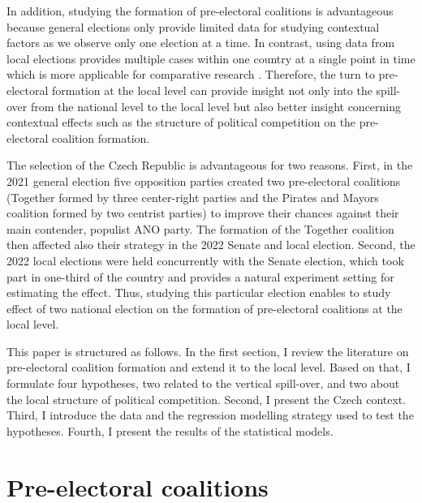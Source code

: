 \documentclass[fignum,12pt,titlepage]{article}
\begin{document}
In addition, studying the formation of pre-electoral coalitions is advantageous because general elections only provide limited data for studying contextual factors as we observe only one election at a time. In contrast, using data from local elections provides multiple cases within one country at a single point in time which is more applicable for comparative research \parencite[77]{back2008}. Therefore, the turn to pre-electoral formation at the local level can provide insight not only into the spill-over from the national level to the local level but also better insight concerning contextual effects such as the structure of political competition on the pre-electoral coalition formation.


The selection of the Czech Republic is advantageous for two reasons. First, in the 2021 general election five opposition parties created two pre-electoral coalitions (Together formed by three center-right parties and the Pirates and Mayors coalition formed by two centrist parties) to improve their chances against their main contender, populist ANO party. The formation of the Together coalition then affected also their strategy in the 2022 Senate and local election. Second, the 2022 local elections were held concurrently with the Senate election, which took part in one-third of the country and provides a natural experiment setting for estimating the effect. Thus, studying this particular election enables to study effect of two national election on the formation of pre-electoral coalitions at the local level.

This paper is structured as follows. In the first section, I review the literature on pre-electoral coalition formation and extend it to the local level. Based on that, I formulate four hypotheses, two related to the vertical spill-over, and two about the local structure of political competition. Second, I present the Czech context. Third, I introduce the data and the regression modelling strategy used to test the hypotheses. Fourth, I present the results of the statistical models.

\section{Pre-electoral coalitions}
\end{document}

